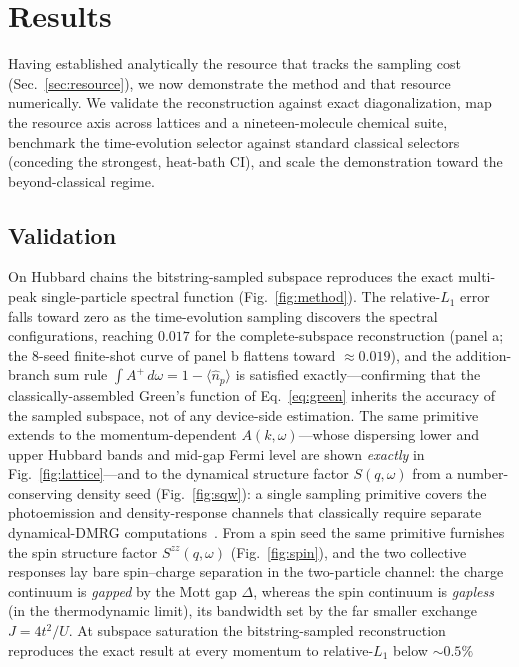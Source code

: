 \section{Results}

Having established analytically the resource that tracks the sampling cost (Sec.~\ref{sec:resource}), we
now demonstrate the method and that resource numerically. We validate the reconstruction against exact
diagonalization, map the resource axis across lattices
and a nineteen-molecule chemical suite, benchmark the time-evolution selector against standard classical
selectors (conceding the strongest, heat-bath CI), and scale the demonstration toward the beyond-classical regime.

\subsection{Validation}
On Hubbard chains the bitstring-sampled subspace reproduces the exact multi-peak single-particle
spectral function (Fig.~\ref{fig:method}). The relative-$L_1$ error falls toward zero
as the time-evolution sampling discovers the spectral configurations, reaching $0.017$ for the
complete-subspace reconstruction (panel a; the $8$-seed finite-shot curve of panel b flattens toward
$\approx0.019$), and the addition-branch sum rule $\int A^{+}\,d\omega=1-\langle \hat n_p\rangle$ is satisfied
exactly---confirming that the classically-assembled Green's function of Eq.~\eqref{eq:green} inherits
the accuracy of the sampled subspace, not of any device-side estimation. The same primitive extends to
the momentum-dependent $A(k,\omega)$---whose dispersing lower and upper Hubbard bands and mid-gap Fermi
level are shown \emph{exactly} in Fig.~\ref{fig:lattice}---and to the dynamical structure factor
$S(q,\omega)$ from a number-conserving density seed (Fig.~\ref{fig:sqw}): a single sampling primitive
covers the photoemission and density-response channels that classically require separate dynamical-DMRG
computations~\cite{jeckelmann2002,nocera2016}. From a spin seed the same primitive furnishes the spin
structure factor $S^{zz}(q,\omega)$ (Fig.~\ref{fig:spin}), and the two collective responses lay bare
spin--charge separation in the two-particle channel: the charge continuum is \emph{gapped} by the Mott
gap $\Delta$, whereas the spin continuum is \emph{gapless} (in the thermodynamic limit), its bandwidth set by the far smaller exchange $J=4t^2/U$.
At subspace saturation the bitstring-sampled reconstruction
reproduces the exact result at every momentum to relative-$L_1$ below $\sim\!0.5\%$
